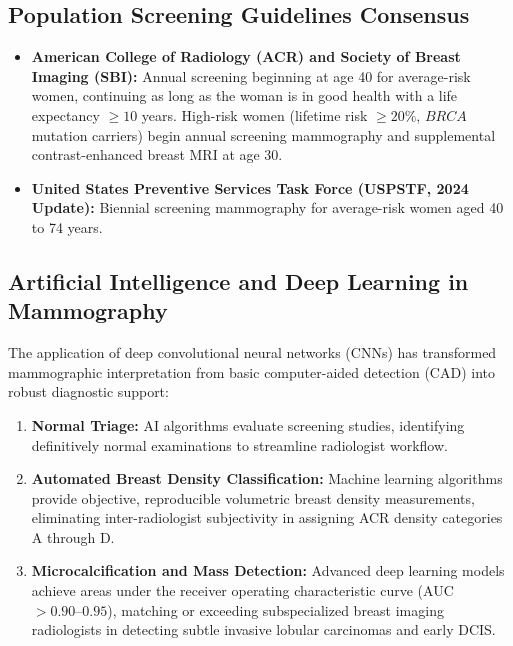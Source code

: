 \documentclass[11pt,a4paper]{article}
\begin{document}
\subsection{Population Screening Guidelines Consensus}

\begin{itemize}[leftmargin=*]
    \item \textbf{American College of Radiology (ACR) and Society of Breast Imaging (SBI):} Annual screening beginning at age 40 for average-risk women, continuing as long as the woman is in good health with a life expectancy $\ge 10$ years. High-risk women (lifetime risk $\ge 20\%$, $BRCA$ mutation carriers) begin annual screening mammography and supplemental contrast-enhanced breast MRI at age 30.
    \item \textbf{United States Preventive Services Task Force (USPSTF, 2024 Update):} Biennial screening mammography for average-risk women aged 40 to 74 years.
\end{itemize}

\subsection{Artificial Intelligence and Deep Learning in Mammography}

The application of deep convolutional neural networks (CNNs) has transformed mammographic interpretation from basic computer-aided detection (CAD) into robust diagnostic support:
\begin{enumerate}[leftmargin=*]
    \item \textbf{Normal Triage:} AI algorithms evaluate screening studies, identifying definitively normal examinations to streamline radiologist workflow.
    \item \textbf{Automated Breast Density Classification:} Machine learning algorithms provide objective, reproducible volumetric breast density measurements, eliminating inter-radiologist subjectivity in assigning ACR density categories A through D.
    \item \textbf{Microcalcification and Mass Detection:} Advanced deep learning models achieve areas under the receiver operating characteristic curve (AUC $> 0.90\text{--}0.95$), matching or exceeding subspecialized breast imaging radiologists in detecting subtle invasive lobular carcinomas and early DCIS.
\end{enumerate}
\end{document}
